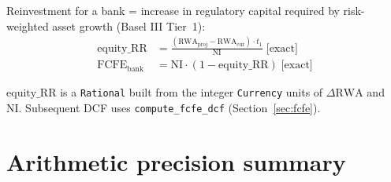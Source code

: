\documentclass[11pt, a4paper, oneside]{article}
\newcommand{\FCFE}{\mathrm{FCFE}}
\newcommand{\exact}{\;\text{[exact]}}
\begin{document}
Reinvestment for a bank = increase in regulatory capital required by
risk-weighted asset growth (Basel III Tier~1):
\begin{align}
  \mathrm{equity\_RR} &= \frac{(\mathrm{RWA}_\text{proj} - \mathrm{RWA}_\text{cur})
                               \cdot t_1}{\mathrm{NI}} \exact
  \label{eq:bank_rr}\\
  \FCFE_\text{bank} &= \mathrm{NI} \cdot (1 - \mathrm{equity\_RR}) \exact
  \label{eq:bank_fcfe}
\end{align}

$\mathrm{equity\_RR}$ is a \texttt{Rational} built from the integer
\texttt{Currency} units of $\Delta\mathrm{RWA}$ and NI.
Subsequent DCF uses \texttt{compute\_fcfe\_dcf} (Section~\ref{sec:fcfe}).

\section{Arithmetic precision summary}
\label{sec:precision}
\end{document}
